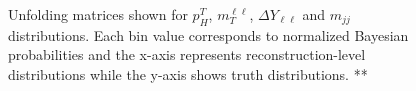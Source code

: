 \begin{figure}[!h]
\centering
  \hfill
  \hfill
  \hfill
\caption{\label{fig:unfoldingmatrices}Unfolding matrices shown for $p^T_H$, $m_T^{\ell\ell}$, $\Delta Y_{\ell\ell}$ and $m_{jj}$ distributions. Each bin value corresponds to normalized Bayesian probabilities and the x-axis represents reconstruction-level distributions while the y-axis shows truth distributions. **}
\end{figure}  

